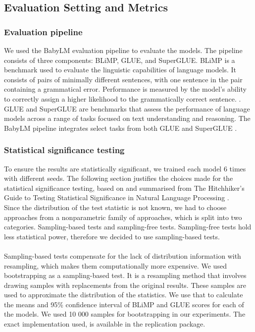 \subsection{Evaluation Setting and Metrics}
\subsubsection{Evaluation pipeline}
We used the BabyLM evaluation pipeline \cite{Warstadt2023} to evaluate the models. The pipeline consists of three components: BLiMP, GLUE, and SuperGLUE. BLiMP is a benchmark used to evaluate the linguistic capabilities of language models. It consists of pairs of minimally different sentences, with one sentence in the pair containing a grammatical error. Performance is measured by the model's ability to correctly assign a higher likelihood to the grammatically correct sentence. \cite{Warstadt2023blimp} \cite{warstadt-etal-2023-findings}. GLUE and SuperGLUE are benchmarks that assess the performance of language models across a range of tasks focused on text understanding and reasoning. The BabyLM pipeline integrates select tasks from both GLUE and SuperGLUE\footnotemark[5] \cite{Wang2019} \cite{Wang2020}.

\subsubsection{Statistical significance testing}
To ensure the results are statistically significant, we trained each model 6 times with different seeds. The following section justifies the choices made for the statistical significance testing, based on and summarised from The Hitchhiker’s Guide to Testing Statistical Significance in Natural Language Processing \cite{dror2018hitchhikers}. \\
Since the distribution of the test statistic is not known, we had to choose approaches from a nonparametric family of approaches, which is split into two categories. Sampling-based tests and sampling-free tests. Sampling-free tests hold less statistical power, therefore we decided to use sampling-based tests.
\\\\
Sampling-based tests compensate for the lack of distribution information with resampling, which makes them computationally more expensive. We used bootstrapping as a sampling-based test. It is a resampling method that involves drawing samples with replacements from the original results. These samples are used to approximate the distribution of the statistics. We use that to calculate the means and 95\% confidence interval of BLiMP and GLUE scores for each of the models. We used 10 000 samples for bootstrapping in our experiments. The exact implementation used, is available in the replication package\footnotemark[6].

